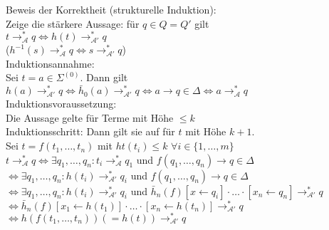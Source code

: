 \documentclass[titlepage]{article}
\begin{document}
Beweis der Korrektheit (strukturelle Induktion):\\
Zeige die st\"arkere Aussage: f\"ur $q \in Q = Q'$ gilt \\
$t \to_\mathcal{A}^\ast q \Leftrightarrow h(t) \to_{\mathcal{A}'}^\ast q$\\
($h^{-1}(s) \to_\mathcal{A}^\ast q \Leftrightarrow s \to_{\mathcal{A}'}^\ast q$)\\

Induktionsannahme:\\
Sei $t = a \in \Sigma^{(0)}$. Dann gilt
$h(a) \to_{\mathcal{A}'}^\ast q \Leftrightarrow
\bar{h}_0(a) \to_{\mathcal{A}'}^\ast q \Leftrightarrow
a \to q \in \Delta \Leftrightarrow a \to_\mathcal{A}^\ast q$\\

Induktionsvoraussetzung:\\
Die Aussage gelte f\"ur Terme mit H\"ohe $\leq k$\\

Induktionsschritt: Dann gilt sie auf f\"ur $t$ mit H\"ohe $k+1$.\\
Sei $t = f(t_1, \dots, t_n)$ mit $ht(t_i) \leq k$ $\forall i \in \{1, \dots, m\}$\\

$t \to_\mathcal{A}^\ast q \Leftrightarrow \exists q_1, \dots, q_n: t_i \to_\mathcal{A}^\ast q_1$
und $f(q_1, \dots, q_n) \to q \in \Delta$\\
$\Leftrightarrow \exists q_1, \dots, q_n: h(t_i) \to_{\mathcal{A}'}^\ast q_i$ und
$f(q_1, \dots, q_n) \to q \in \Delta$ \\
$\Leftrightarrow \exists q_1, \dots, q_n: h(t_i) \to_{\mathcal{A}'}^\ast q_i$ und
$\bar{h}_n(f)[x \leftarrow q_i] \cdot \dots \cdot [x_n \leftarrow q_n] \to_{\mathcal{A}'}^\ast q$\\
$\Leftrightarrow \bar{h}_n(f)[x_1 \leftarrow h(t_1)] \cdot \dots \cdot 
[x_n \leftarrow h(t_n)] \to_{\mathcal{A}'}^\ast q$\\
$\Leftrightarrow h(f(t_1, \dots, t_n)) (=h(t)) \to_{\mathcal{A}'}^\ast q$
\end{document}
